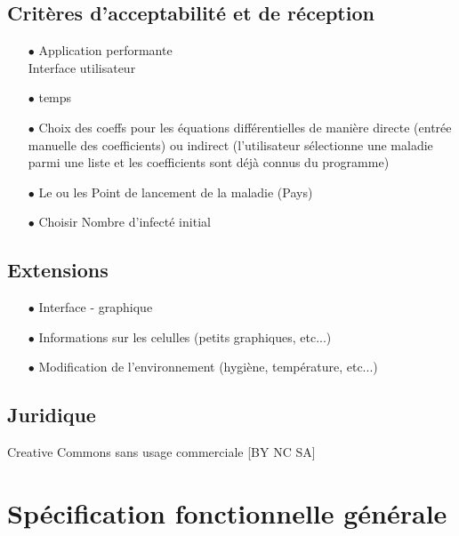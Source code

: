 \documentclass[12pt,a4paper]{report}
\begin{document}
\subsection*{Critères d'acceptabilité et de réception}
\begin{flushleft}
  \begin{itemize}
	\item[$\bullet$] Application performante \\ 
	Interface utilisateur
	\item[$\bullet$] temps 
	\item[$\bullet$] Choix des coeffs pour les équations différentielles de manière directe (entrée manuelle des coefficients) ou indirect (l'utilisateur sélectionne une maladie parmi une liste et les coefficients sont déjà connus du programme)
	\item[$\bullet$] Le ou les Point de lancement de la maladie (Pays) 
	\item[$\bullet$] Choisir Nombre d'infecté initial
  \end{itemize}
\end{flushleft}

\subsection*{Extensions}
\begin{flushleft}
  \begin{itemize}
	\item[$\bullet$] Interface - graphique 
	\item[$\bullet$] Informations sur les celulles (petits graphiques, etc...) 
	\item[$\bullet$] Modification de l'environnement (hygiène, température, etc...) 
  \end{itemize}
\end{flushleft}

\subsection*{Juridique}
\begin{flushleft}
Creative Commons sans usage commerciale [BY NC SA]
\end{flushleft}

\section*{Spécification fonctionnelle générale}
\end{document}
